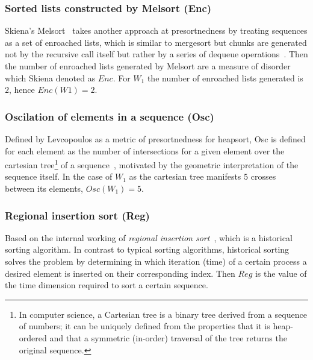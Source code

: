 \subsubsection{Sorted lists constructed by Melsort (Enc)}
Skiena's Melsort~\cite{Skiena_1988} takes another approach at presortnedness by treating sequences as a set of enroached lists, which is similar to mergesort but chunks are generated not by the recursive call itself but rather by a series of dequeue operations~\cite{Baeza-Yates_Manber_1992}. Then the number of enroached lists generated by Melsort are a measure of disorder which Skiena denoted as $Enc$. For $W_1$ the number of enroached lists generated is $2$, hence $Enc(W1)=2$.\\

\subsubsection{Oscilation of elements in a sequence (Osc)}
Defined by Levcopoulos as a metric of presortnedness for heapsort, Osc is defined for each element as the number of intersections for a given element over the cartesian tree\footnote{In computer science, a Cartesian tree is a binary tree derived from a sequence of numbers; it can be uniquely defined from the properties that it is heap-ordered and that a symmetric (in-order) traversal of the tree returns the original sequence.} of a sequence~\cite{Levcopoulos_Petersson_1993}, motivated by the geometric interpretation of the sequence itself. In the case of $W_1$ as the cartesian tree manifests $5$ crosses between its  elements, $Osc(W_1) = 5$.\\

\subsubsection{Regional insertion sort (Reg)}
Based on the internal working of \textit{regional insertion sort}~\cite{Cantoni_Creutzburg_Levialdi_Wolf_1989}, which is a historical sorting algorithm. In contrast to typical sorting algorithms, historical sorting solves the problem by determining in which iteration (time) of a certain process a desired element is inserted on their corresponding index. Then $Reg$ is the value of the time dimension required to sort a certain sequence. 
